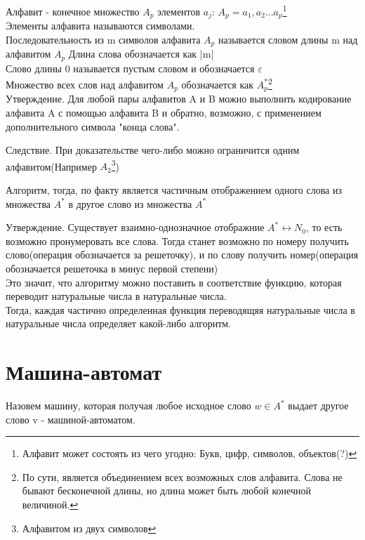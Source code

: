\documentclass[a4paper,12pt]{article}
\begin{document}
Алфавит - конечное множество $A_p$ элементов $a_j$: $A_p = {a_1, a_2...a_p}$\footnote{Алфавит может состоять из чего угодно: Букв, цифр, символов, объектов(?)}\\
Элементы алфавита называются символами.\\
Последовательность из m символов алфавита $A_p$ называется словом длины m над алфавитом $A_p$
Длина слова обозначается как |m|\\
Слово длины 0 называется пустым словом и обозначается $\varepsilon$\\
Множество всех слов над алфавитом $A_p$ обозначается как $A_p^*$\footnote{По сути, является объединением всех возможных слов алфавита. Слова не бывают бесконечной длины, но длина может быть любой конечной величиной.}\\

Утверждение. Для любой пары алфавитов A и B можно выполнить кодирование алфавита A с помощью алфавита B и обратно, возможно, с применением дополнительного символа "конца слова".

Следствие. При доказательстве чего-либо можно ограничится одним алфавитом(Например $A_2$\footnote{Алфавитом из двух символов})

Алгоритм, тогда, по факту является частичным отображением одного слова из множества $A^*$ в другое слово из множества $A^*$

Утверждение. Существует взаимно-однозначное отображние $A^* \leftrightarrow N_0$, то есть возможно пронумеровать все слова. Тогда станет возможно по номеру получить слово(операция обозначается за решеточку), и по слову получить номер(операция обозначается решеточка в минус первой степени)\\
Это значит, что алгоритму можно поставить в соответствие функцию, которая переводит натуральные числа в натуральные числа.\\
Тогда, каждая частично определенная функция переводящяя натуральные числа в натуральные числа определяет какой-либо алгоритм.

\section{Машина-автомат}
Назовем машину, которая получая любое исходное слово $w \in A^*$ выдает другое слово v - машиной-автоматом.
\end{document}
